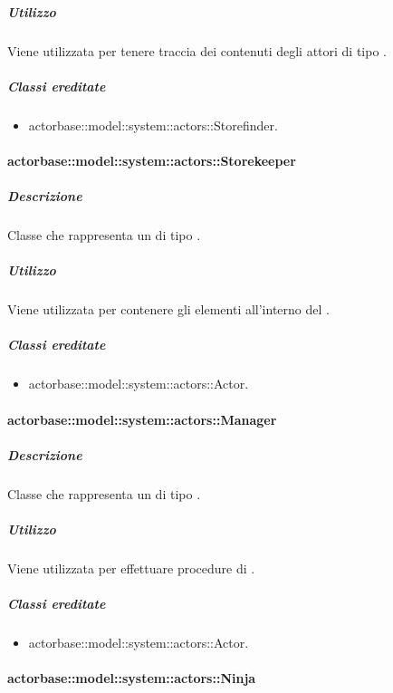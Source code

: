 \documentclass{scalatekids-article}
\begin{document}
\subparagraph{Utilizzo}

Viene utilizzata per tenere traccia dei contenuti degli attori di tipo
.

\subparagraph{Classi ereditate}

\begin{itemize}
\item actorbase::model::system::actors::Storefinder.
\end{itemize}

\paragraph{actorbase::model::system::actors::Storekeeper}

\subparagraph{Descrizione}

Classe che rappresenta un  di tipo .

\subparagraph{Utilizzo}

Viene utilizzata per contenere gli elementi all'interno del .

\subparagraph{Classi ereditate}

\begin{itemize}
\item actorbase::model::system::actors::Actor.
\end{itemize}

\paragraph{actorbase::model::system::actors::Manager}

\subparagraph{Descrizione}

Classe che rappresenta un  di tipo .

\subparagraph{Utilizzo}

Viene utilizzata per effettuare procedure di .

\subparagraph{Classi ereditate}

\begin{itemize}
\item actorbase::model::system::actors::Actor.
\end{itemize}

\paragraph{actorbase::model::system::actors::Ninja}
\end{document}

